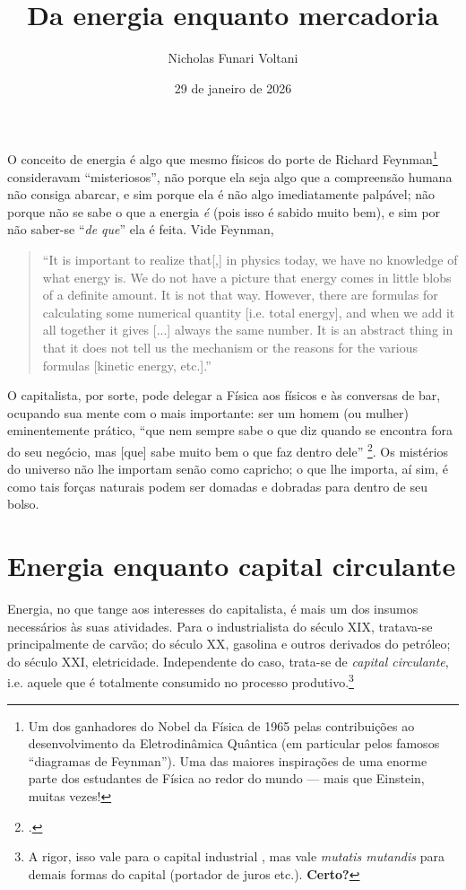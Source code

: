 \documentclass[12pt]{article}
\title{Da energia enquanto mercadoria}
\author{Nicholas Funari Voltani}
\date{29 de janeiro de 2026}
\begin{document}
\maketitle

\section{}
O conceito de energia é algo que mesmo físicos do porte de Richard Feynman\footnote{Um dos ganhadores do Nobel da Física de 1965 pelas contribuições ao desenvolvimento da Eletrodinâmica Quântica (em particular pelos famosos ``diagramas de Feynman''). Uma das maiores inspirações de uma enorme parte dos estudantes de Física ao redor do mundo --- mais que Einstein, muitas vezes!} consideravam ``misteriosos'', não porque ela seja algo que a compreensão humana não consiga abarcar, e sim porque ela é não algo imediatamente palpável; não porque não se sabe o que a energia \textit{é} (pois isso é sabido muito bem), e sim por não saber-se ``\textit{de que}'' ela é feita. Vide Feynman,
\begin{quote}
    ``It is important to realize that[,] in physics today, we have no knowledge of what energy is. We do not have a picture that energy comes in little blobs of a definite amount. It is not that way. However, there are formulas for calculating some numerical quantity [i.e. total energy], and when we add it all together it gives [...] always the same number. It is an abstract thing in that it does not tell us the mechanism or the reasons for the various formulas [kinetic energy, etc.].'' \cite[Vol I, Cap. 4]{Feynman2006}
\end{quote}

O capitalista, por sorte, pode delegar a Física aos físicos e às conversas de bar, ocupando sua mente com o mais importante: ser um homem (ou mulher) eminentemente prático, ``que nem sempre sabe o que diz quando se encontra fora do seu negócio, mas [que] sabe muito bem o que faz dentro dele'' \footnote{\textcite[p. 269]{Marx2017}.}. Os mistérios do universo não lhe importam senão como capricho; o que lhe importa, aí sim, é como tais forças naturais podem ser domadas e dobradas para dentro de seu bolso.

\section{Energia enquanto capital circulante}
Energia, no que tange aos interesses do capitalista, é mais um dos insumos necessários às suas atividades. Para o industrialista do século XIX, tratava-se principalmente de carvão; do século XX, gasolina e outros derivados do petróleo; do século XXI, eletricidade. Independente do caso, trata-se de \textit{capital circulante}, i.e. aquele que é totalmente consumido no processo produtivo.\footnote{A rigor, isso vale para o capital industrial \cite{Marx2017,Marx2014}, mas vale \textit{mutatis mutandis} para demais formas do capital (portador de juros etc.). \textbf{Certo?}}
\end{document}
